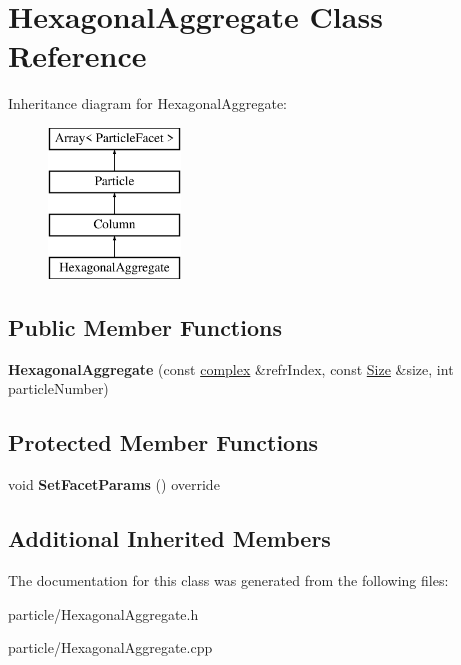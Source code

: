 \hypertarget{class_hexagonal_aggregate}{}\section{Hexagonal\+Aggregate Class Reference}
\label{class_hexagonal_aggregate}
Inheritance diagram for Hexagonal\+Aggregate\+:\begin{figure}[H]
\begin{center}
\leavevmode
\includegraphics[height=4.000000cm]{class_hexagonal_aggregate}
\end{center}
\end{figure}
\subsection*{Public Member Functions}
\begin{DoxyCompactItemize}
\item 
\mbox{\label{class_hexagonal_aggregate_a3ebac4728ad288d82ac7506c1e4a6d16}} 
{\bfseries Hexagonal\+Aggregate} (const \mbox{\hyperlink{classcomplex}{complex}} \&refr\+Index, const \mbox{\hyperlink{struct_size}{Size}} \&size, int particle\+Number)
\end{DoxyCompactItemize}
\subsection*{Protected Member Functions}
\begin{DoxyCompactItemize}
\item 
\mbox{\label{class_hexagonal_aggregate_af6bec3e2933468de2d82efb7368bb7d1}} 
void {\bfseries Set\+Facet\+Params} () override
\end{DoxyCompactItemize}
\subsection*{Additional Inherited Members}


The documentation for this class was generated from the following files\+:\begin{DoxyCompactItemize}
\item 
particle/Hexagonal\+Aggregate.\+h\item 
particle/Hexagonal\+Aggregate.\+cpp\end{DoxyCompactItemize}
